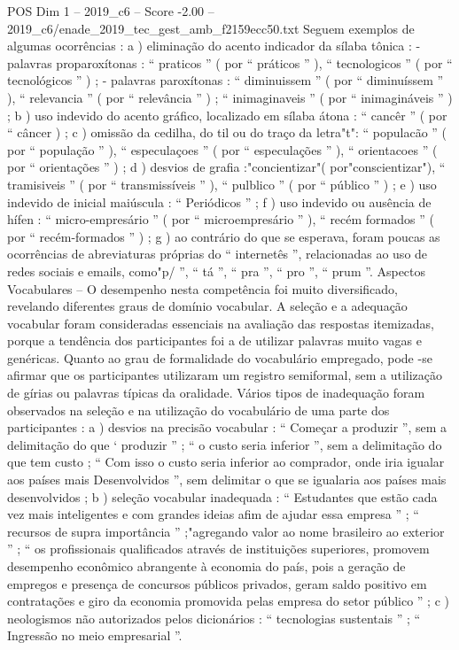 \begin{textsample}{POS Dim 1 – 2019\_c6 – Score -2.00 – 2019\_c6/enade\_2019\_tec\_gest\_amb\_f2159ecc50.txt}
Seguem exemplos de algumas ocorrências : a ) eliminação do acento indicador da sílaba tônica : - palavras proparoxítonas : “ praticos ” ( por “ práticos ” ), “ tecnologicos ” ( por “ tecnológicos ” ) ; - palavras paroxítonas : “ diminuissem ” ( por “ diminuíssem ” ), “ relevancia ” ( por “ relevância ” ) ; “ inimaginaveis ” ( por “ inimagináveis ” ) ; b ) uso indevido do acento gráfico, localizado em sílaba átona : “ cancêr ” ( por “ câncer ) ; c ) omissão da cedilha, do til ou do traço da letra"t": “ populacão ” ( por “ população ” ), “ especulaçoes ” ( por “ especulações ” ), “ orientacoes ” ( por “ orientações ” ) ; d ) desvios de grafia :"concientizar"( por"conscientizar"), “ tramisiveis ” ( por “ transmissíveis ” ), “ pulblico ” ( por “ público ” ) ; e ) uso indevido de inicial maiúscula : “ Periódicos ” ; f ) uso indevido ou ausência de hífen : “ micro-empresário ” ( por “ microempresário ” ), “ recém formados ” ( por “ recém-formados ” ) ; g ) ao contrário do que se esperava, foram poucas as ocorrências de abreviaturas próprias do “ internetês ”, relacionadas ao uso de redes sociais e emails, como"p/ ”, “ tá ”, “ pra ”, “ pro ”, “ prum ”.
Aspectos Vocabulares – O desempenho nesta competência foi muito diversificado, revelando diferentes graus de domínio vocabular.
A seleção e a adequação vocabular foram consideradas essenciais na avaliação das respostas itemizadas, porque a tendência dos participantes foi a de utilizar palavras muito vagas e genéricas.
Quanto ao grau de formalidade do vocabulário empregado, pode -se afirmar que os participantes utilizaram um registro semiformal, sem a utilização de gírias ou palavras típicas da oralidade.
Vários tipos de inadequação foram observados na seleção e na utilização do vocabulário de uma parte dos participantes : a ) desvios na precisão vocabular : “ Começar a produzir ”, sem a delimitação do que ‘ produzir ” ; “ o custo seria inferior ”, sem a delimitação do que tem custo ; “ Com isso o custo seria inferior ao comprador, onde iria igualar aos países mais Desenvolvidos ”, sem delimitar o que se igualaria aos países mais desenvolvidos ; b ) seleção vocabular inadequada : “ Estudantes que estão cada vez mais inteligentes e com grandes ideias afim de ajudar essa empresa ” ; “ recursos de supra importância ” ;"agregando valor ao nome brasileiro ao exterior ” ; “ os profissionais qualificados através de instituições superiores, promovem desempenho econômico abrangente à economia do país, pois a geração de empregos e presença de concursos públicos privados, geram saldo positivo em contratações e giro da economia promovida pelas empresa do setor público ” ; c ) neologismos não autorizados pelos dicionários : “ tecnologias sustentais ” ; “ Ingressão no meio empresarial ”.

\end{textsample}
